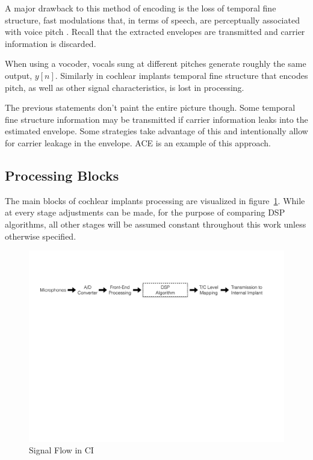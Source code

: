 \documentclass [11pt, proquest,oneside] {ganter_thesis}[2015/03/03]
\begin{document}
A major drawback to this method of encoding is the loss of temporal fine structure, fast modulations that, in terms of speech, are perceptually associated with voice pitch \cite{li2013temporal}.  Recall that the extracted envelopes are transmitted and carrier information is discarded.

When using a vocoder, vocals sung at different pitches generate roughly the same output, $y[n]$.  Similarly in cochlear implants temporal fine structure that encodes pitch, as well as other signal characteristics, is lost in processing.

The previous statements don't paint the entire picture though.  Some temporal fine structure information may be transmitted if carrier information leaks into the estimated envelope.  Some strategies take advantage of this and intentionally allow for carrier leakage in the envelope.  ACE is an example of this approach.


\subsection{Processing Blocks}

The main blocks of cochlear implants processing are visualized in figure~\ref{fig:CI_signal_flow}.  While at every stage adjustments can be made, for the purpose of comparing DSP algorithms, all other stages will be assumed constant throughout this work unless otherwise specified.

\begin{figure}[!ht]
  \centering
    \includegraphics[width=1\textwidth]{CI_Signal_Flow}   
    \caption{Signal Flow in CI}\label{fig:CI_signal_flow}
\end{figure}
\end{document}
